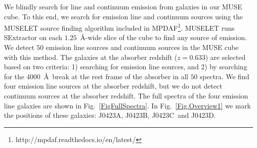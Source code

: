 \documentclass[a4paper,fleqn,usenatbib]{mnras}
\newcommand{\GalA}{J0423A}
\newcommand{\GalB}{J0423B}
\newcommand{\GalC}{J0423C}
\newcommand{\GalD}{J0423D}
\begin{document}

We blindly search for line and continuum emission from galaxies in our MUSE cube. To this end, we search for emission line and continuum sources using the MUSELET source finding algorithm included in MPDAF\footnote{http://mpdaf.readthedocs.io/en/latest/}. MUSELET runs SExtractor \mbox{\citep{Bertin1996SExtractor}} on each $1.25$~\AA-wide slice of the cube to find any source of emission. We detect $50$ emission line sources and continuum sources in the MUSE cube with this method. The galaxies at the absorber redshift ($z = 0.633$) are selected based on two criteria: 1) searching for emission line sources, and 2) by searching for the $4000$~\AA\ break at the rest frame of the absorber in all $50$ spectra. We find four emission line sources at the absorber redshift, but we do not detect continuum sources at the absorber redshift. The full spectra of the four emission line galaxies are shown in Fig.~\ref{FigFullSpectra}. In Fig.~\ref{Fig.Overview1} we mark the positions of these galaxies: \GalA, \GalB, \GalC\ and \GalD.

\end{document}
